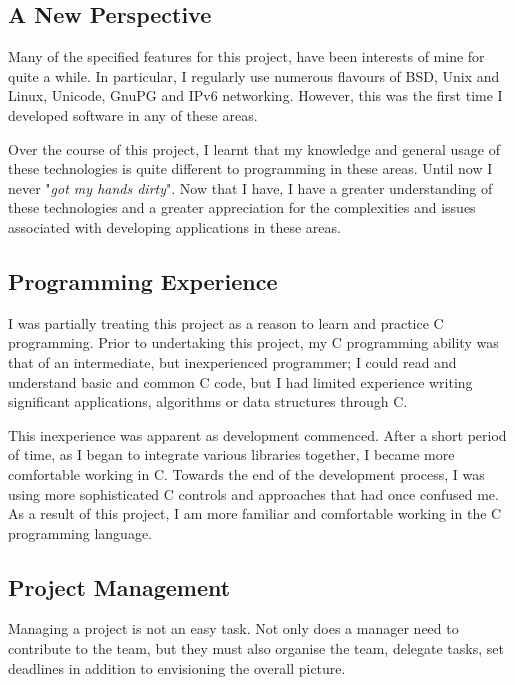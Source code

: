 
\subsection{A New Perspective}

Many of the specified features for this project, have been interests of
mine for quite a while. In particular, I regularly use numerous flavours
of BSD, Unix and Linux, Unicode, GnuPG and IPv6 networking. However, this 
was the first time I developed software in any of these areas.


Over the course of this project, I learnt that my knowledge and general
usage of these technologies is quite different to programming in these
areas. Until now I never "\emph{got my hands dirty}". Now that I have, I
have a greater understanding of these technologies and a greater
appreciation for the complexities and issues associated with developing
applications in these areas.

\subsection{Programming Experience}

I was partially treating this project as a reason to learn and practice
C programming. Prior to undertaking this project, my C programming ability
was that of an intermediate, but inexperienced programmer; I could read 
and understand basic and common C code, but I had limited experience
writing significant applications, algorithms or data structures through
C.


This inexperience was apparent as development commenced. After a short
period of time, as I began to integrate various libraries together, I
became more comfortable working in C. Towards the end of the
development process, I was using more sophisticated C controls and
approaches that had once confused me. As a result of this project, I am
more familiar and comfortable working in the C programming language.


\subsection{Project Management}


Managing a project is not an easy task. Not only does a manager need to
contribute to the team, but they must also organise the team, delegate
tasks, set deadlines in addition to envisioning the overall picture.


